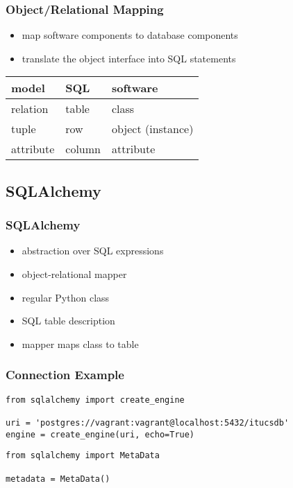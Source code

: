 \documentclass[dvipsnames]{beamer}
\theoremstyle{plain}
\begin{document}
\begin{frame}
  \frametitle{Object/Relational Mapping}

  \begin{itemize}
    \item map software components to database components
    \item translate the object interface into SQL statements
  \end{itemize}

  \begin{table}
    \begin{tabular}{|l|l|l|}\hline
model     & SQL    & software\\[2pt]\hline\hline
relation  & table  & class\\\hline
tuple     & row    & object (instance)\\\hline
attribute & column & attribute\\\hline
      \end{tabular}
    \end{table}
\end{frame}

\subsection{SQLAlchemy}

\begin{frame}
  \frametitle{SQLAlchemy}

  \begin{itemize}
    \item abstraction over SQL expressions
    \item object-relational mapper

    \medskip
    \item regular Python class
    \item SQL table description
    \item mapper maps class to table
  \end{itemize}
\end{frame}

\begin{frame}[fragile]
  \frametitle{Connection Example}

  \begin{lstlisting}
from sqlalchemy import create_engine

uri = 'postgres://vagrant:vagrant@localhost:5432/itucsdb'
engine = create_engine(uri, echo=True)
  \end{lstlisting}

  \pause
  \medskip
  \begin{lstlisting}
from sqlalchemy import MetaData

metadata = MetaData()
  \end{lstlisting}
\end{frame}
\end{document}
